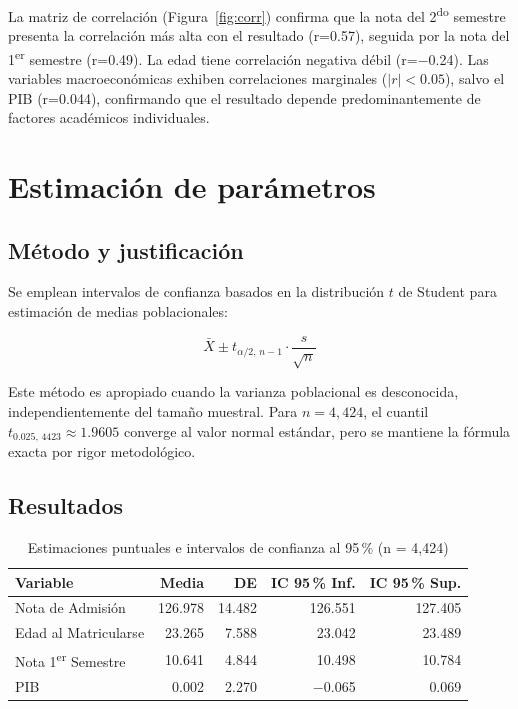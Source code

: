 \documentclass[11pt,a4paper]{article}
\begin{document}
La matriz de correlación (Figura~\ref{fig:corr}) confirma que la nota del 2\textsuperscript{do} semestre presenta la correlación más alta con el resultado (r=0.57), seguida por la nota del 1\textsuperscript{er} semestre (r=0.49). La edad tiene correlación negativa débil (r=$-$0.24). Las variables macroeconómicas exhiben correlaciones marginales ($|r|<0.05$), salvo el PIB (r=0.044), confirmando que el resultado depende predominantemente de factores académicos individuales.

\section{Estimación de parámetros}


\subsection{Método y justificación}

Se emplean intervalos de confianza basados en la distribución $t$ de Student para estimación de medias poblacionales:

\[
\bar{X} \pm t_{\alpha/2,\, n-1} \cdot \frac{s}{\sqrt{n}}
\]

Este método es apropiado cuando la varianza poblacional es desconocida, independientemente del tamaño muestral. Para $n=4{,}424$, el cuantil $t_{0.025,\,4423} \approx 1.9605$ converge al valor normal estándar, pero se mantiene la fórmula exacta por rigor metodológico.

\subsection{Resultados}

\begin{table}[h!]
\centering
\begin{tabular}{lrrrr}
\toprule
\textbf{Variable} & \textbf{Media} & \textbf{DE} & \textbf{IC 95\,\% Inf.} & \textbf{IC 95\,\% Sup.} \\
\midrule
Nota de Admisión          & 126.978 & 14.482 & 126.551 & 127.405 \\
Edad al Matricularse      &  23.265 &  7.588 &  23.042 &  23.489 \\
Nota 1\textsuperscript{er} Semestre    &  10.641 &  4.844 &  10.498 &  10.784 \\
PIB                       &   0.002 &  2.270 &  $-$0.065 &   0.069 \\
\bottomrule
\end{tabular}
\label{tab:ci}
\caption{Estimaciones puntuales e intervalos de confianza al 95\,\% (n = 4,424)}
\end{table}
\end{document}
